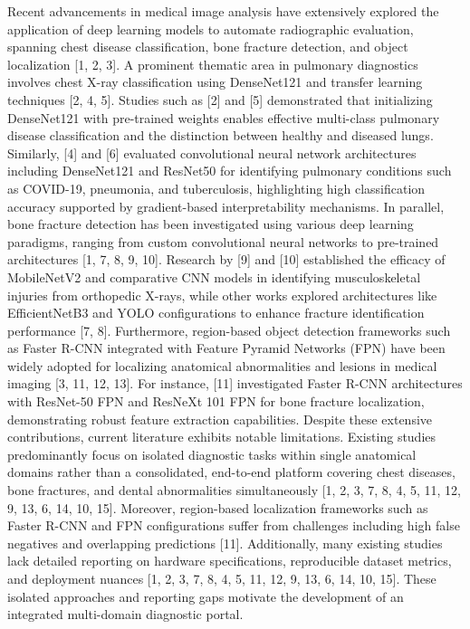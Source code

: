 \documentclass[conference]{IEEEtran}
\begin{document}
Recent advancements in medical image analysis have extensively explored the application of deep learning models to automate radiographic evaluation, spanning chest disease classification, bone fracture detection, and object localization [1, 2, 3]. A prominent thematic area in pulmonary diagnostics involves chest X-ray classification using DenseNet121 and transfer learning techniques [2, 4, 5]. Studies such as [2] and [5] demonstrated that initializing DenseNet121 with pre-trained weights enables effective multi-class pulmonary disease classification and the distinction between healthy and diseased lungs. Similarly, [4] and [6] evaluated convolutional neural network architectures including DenseNet121 and ResNet50 for identifying pulmonary conditions such as COVID-19, pneumonia, and tuberculosis, highlighting high classification accuracy supported by gradient-based interpretability mechanisms. In parallel, bone fracture detection has been investigated using various deep learning paradigms, ranging from custom convolutional neural networks to pre-trained architectures [1, 7, 8, 9, 10]. Research by [9] and [10] established the efficacy of MobileNetV2 and comparative CNN models in identifying musculoskeletal injuries from orthopedic X-rays, while other works explored architectures like EfficientNetB3 and YOLO configurations to enhance fracture identification performance [7, 8]. Furthermore, region-based object detection frameworks such as Faster R-CNN integrated with Feature Pyramid Networks (FPN) have been widely adopted for localizing anatomical abnormalities and lesions in medical imaging [3, 11, 12, 13]. For instance, [11] investigated Faster R-CNN architectures with ResNet-50 FPN and ResNeXt 101 FPN for bone fracture localization, demonstrating robust feature extraction capabilities. Despite these extensive contributions, current literature exhibits notable limitations. Existing studies predominantly focus on isolated diagnostic tasks within single anatomical domains rather than a consolidated, end-to-end platform covering chest diseases, bone fractures, and dental abnormalities simultaneously [1, 2, 3, 7, 8, 4, 5, 11, 12, 9, 13, 6, 14, 10, 15]. Moreover, region-based localization frameworks such as Faster R-CNN and FPN configurations suffer from challenges including high false negatives and overlapping predictions [11]. Additionally, many existing studies lack detailed reporting on hardware specifications, reproducible dataset metrics, and deployment nuances [1, 2, 3, 7, 8, 4, 5, 11, 12, 9, 13, 6, 14, 10, 15]. These isolated approaches and reporting gaps motivate the development of an integrated multi-domain diagnostic portal.
\end{document}
